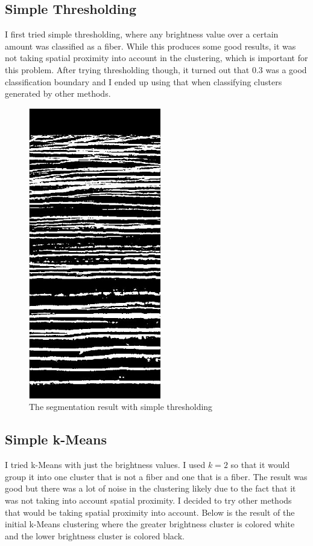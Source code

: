 \documentclass[11pt,psfig]{article}
\begin{document}
\subsection{Simple Thresholding}
I first tried simple thresholding, where any brightness value over a certain amount was classified as a fiber. While this produces some good results, it was not taking spatial proximity into account in the clustering, which is important for this problem. After trying thresholding though, it turned out that $0.3$ was a good classification boundary and I ended up using that when classifying clusters generated by other methods. \\
\begin{figure}[H]
\centering
\includegraphics[height=5in]{thresholdSegmentationResult.jpg}
\caption{The segmentation result with simple thresholding}
\end{figure}

\subsection{Simple k-Means}
I tried k-Means with just the brightness values. I used $k=2$ so that it would group it into one cluster that is not a fiber and one that is a fiber. The result was good but there was a lot of noise in the clustering likely due to the fact that it was not taking into account spatial proximity. I decided to try other methods that would be taking spatial proximity into account. Below is the result of the initial k-Means clustering where the greater brightness cluster is colored white and the lower brightness cluster is colored black. 
\end{document}
